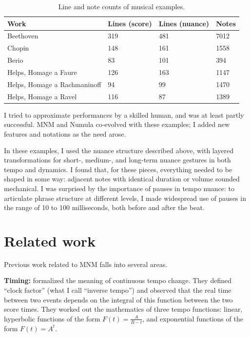 \documentclass[letterpaper, 12pt]{article}
\begin{document}
\begin{table}
\begin{tabular}{l l l l}
Work & Lines (score) & Lines (nuance) & Notes \\
\hline
Beethoven &  319   &      481        &         7012 \\
Chopin   &   148   &      161        &         1558 \\
Berio    &   83    &      101         &        394 \\
Helps, Homage a Faure &   126         &        163         &        1147 \\
Helps, Homage a Rachmaninoff &   94         &         99          &        1470 \\
Helps, Homage a Ravel &   116         &        87           &       1389 \\

\end{tabular}
\caption{Line and note counts of musical examples.}
\label{table:lines}
\end{table}

I tried to approximate performances by a skilled human,
and was at least partly successful.
MNM and Numula co-evolved with these examples;
I added new features and notations as the need arose.

In these examples, I used the nuance structure described above,
with layered transformations for short-, medium-, and long-term nuance gestures
in both tempo and dynamics.
I found that, for these pieces, everything needed to be shaped in some way:
adjacent notes with identical duration or volume sounded mechanical.
I was surprised by the importance of pauses in tempo nuance:
to articulate phrase structure at different levels,
I made widespread use of pauses in the range of 10 to 100 milliseconds,
both before and after the beat.

\section{Related work}

Previous work related to MNM falls into several areas.

\textbf{Timing:}
\cite{Rogers1978} formalized the meaning of continuous tempo change.
They defined ``clock factor'' (what I call ``inverse tempo'')
and observed that the real time between two events depends
on the integral of this function between the two score times.
They worked out the mathematics of three tempo functions:
linear, hyperbolic functions of the form
$ F(t) = \frac{A}{B-t} $,
and exponential functions of the form $ F(t) = A^t $.
\end{document}
